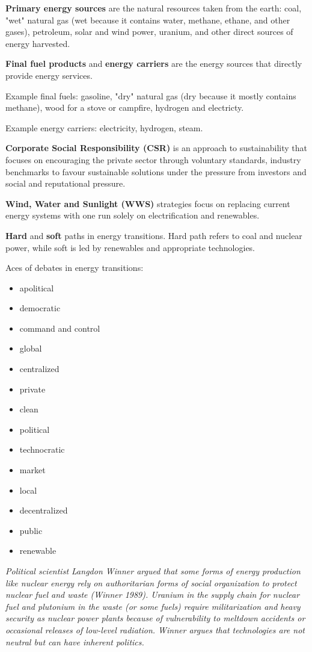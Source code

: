 \textbf{Primary energy sources} are the natural resources taken from the earth:
coal, "wet" natural gas (wet because it contains water, methane, ethane, and
other gases), petroleum, solar and wind power, uranium, and other direct
sources of energy harvested.

\textbf{Final fuel products} and \textbf{energy carriers} are the energy
sources that directly provide energy services.

Example final fuels: gasoline, "dry" natural gas (dry because it mostly
contains methane), wood for a stove or campfire, hydrogen and electricty.

Example energy carriers: electricity, hydrogen, steam.

\textbf{Corporate Social Responsibility (CSR)} is an approach to sustainability
that focuses on encouraging the private sector through voluntary standards,
industry benchmarks to favour sustainable solutions under the pressure from
investors and social and reputational pressure.

\textbf{Wind, Water and Sunlight (WWS)} strategies focus on replacing current
energy systems with one run solely on electrification and renewables.

\textbf{Hard} and \textbf{soft} paths in energy transitions. Hard path refers
to coal and nuclear power, while soft is led by renewables and appropriate
technologies.

Aces of debates in energy transitions:

\begin{itemize}
	\item apolitical
	\item democratic
	\item command and control
	\item global
	\item centralized
	\item private
	\item clean
	\item political
	\item technocratic
	\item market
	\item local
	\item decentralized
	\item public
	\item renewable
\end{itemize}

\textit{
Political scientist Langdon Winner argued that some forms of energy production
like nuclear energy rely on authoritarian forms of social organization to
protect nuclear fuel and waste (Winner 1989). Uranium in the supply chain for
nuclear fuel and plutonium in the waste (or some fuels) require militarization
and heavy security as nuclear power plants because of vulnerability to
meltdown accidents or occasional releases of low-level radiation. Winner argues
that technologies are not neutral but can have inherent politics.
}

